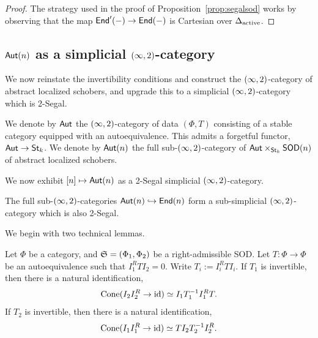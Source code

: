 \begin{proof}
    The strategy used in the proof of Proposition~\ref{prop:segalsod} works by observing that the map $\mathsf{End}'(-)\to\mathsf{End}(-)$ is Cartesian over $\Delta_{\operatorname{active}}$.
\end{proof}

\subsection{\texorpdfstring{$\mathsf{Aut}(n)$}{Aut(n)} as a simplicial \texorpdfstring{$(\infty,2)$}{2}-category}\label{subsection:simplicialaut}
We now reinstate the invertibility conditions and construct the $(\infty,2)$-category of abstract localized schobers, and upgrade this to a simplicial $(\infty,2)$-category which is 2-Segal.

\begin{notn}
    We denote by $\mathsf{Aut}$ the $(\infty,2)$-category of data $(\Phi,T)$ consisting of a stable category equipped with an autoequivalence. This admits a forgetful functor, $\mathsf{Aut}\to\mathsf{St}_k$. We denote by $\mathsf{Aut}(n)$ the full sub-$(\infty,2)$-category of $\mathsf{Aut}\times_{\mathsf{St}_k}\mathsf{SOD}(n)$ of abstract localized schobers.
\end{notn}

We now exhibit $[n]\mapsto \mathsf{Aut}(n)$ as a 2-Segal simplicial $(\infty,2)$-category.

\begin{prop}\label{prop:simplicialaut}
    The full sub-$(\infty,2)$-categories $\mathsf{Aut}(n)\hookrightarrow \mathsf{End}(n)$ form a sub-simplicial $(\infty,2)$-category which is also 2-Segal.
\end{prop}

We begin with two technical lemmas.
\begin{lem}\label{lem:technical}
    Let $\Phi$ be a category, and $\mathfrak{S}=(\Phi_1,\Phi_2)$ be a right-admissible SOD. Let $T:\Phi\to \Phi$ be an autoequivalence such that $I_1^RTI_2=0$. Write $T_i := I_i^RTI_i$. If $T_1$ is invertible, then there is a natural identification,
    \[\operatorname{Cone}(I_2I_2^{R}\to \operatorname{id})\simeq I_1T_1^{-1}I_1^RT.\]
    If $T_2$ is invertible, then there is a natural identification,
    \[\operatorname{Cone}(I_1I_1^{R}\to \operatorname{id})\simeq TI_2T_2^{-1}I_2^R.\]
\end{lem}


